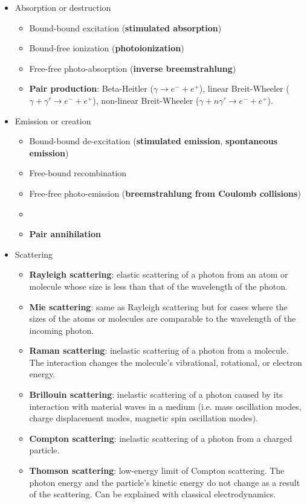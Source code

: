 \documentclass[a4paper,11pt]{article}
\begin{document}
\begin{itemize}
    \item Absorption or destruction 
    \begin{itemize}
        \item Bound-bound excitation (\textbf{stimulated absorption})
        \item Bound-free ionization (\textbf{photoionization})
        \item Free-free photo-absorption (\textbf{inverse breemstrahlung})
        \item \textbf{Pair production}: Beta-Heitler ($\gamma \to e^- + e^+$), linear Breit-Wheeler ($\gamma + \gamma' \to e^- + e^+$), non-linear Breit-Wheeler ($\gamma + n\gamma' \to e^- + e^+$).
    \end{itemize}
    \item Emission or creation
    \begin{itemize}
        \item Bound-bound de-excitation (\textbf{stimulated emission}, \textbf{spontaneous emission})
        \item Free-bound recombination
        \item Free-free photo-emission (\textbf{breemstrahlung from Coulomb collisions})
        \item {}
        \item \textbf{Pair annihilation}
          
    \end{itemize}
    \item Scattering
    \begin{itemize}
        \item \textbf{Rayleigh scattering}: elastic scattering of a photon from an atom or molecule whose size is less than that of the wavelength of the photon. 
        \item \textbf{Mie scattering}: same as Rayleigh scattering but for cases where the sizes of the atoms or molecules are comparable to the wavelength of the incoming photon.
        \item \textbf{Raman scattering}: inelastic scattering of a photon from a molecule. The interaction changes the molecule's vibrational, rotational, or electron energy.
        \item \textbf{Brillouin scattering}: inelastic scattering of a photon caused by its interaction with material waves in a medium (i.e. mass oscillation modes, charge displacement modes, magnetic spin oscillation modes). 
        \item \textbf{Compton scattering}: inelastic scattering of a photon from a charged particle. 
        \item \textbf{Thomson scattering}: low-energy limit of Compton scattering. The photon energy and the particle's kinetic energy do not change as a result of the scattering. Can be explained with classical electrodynamics.
    \end{itemize}
\end{itemize}
\end{document}
